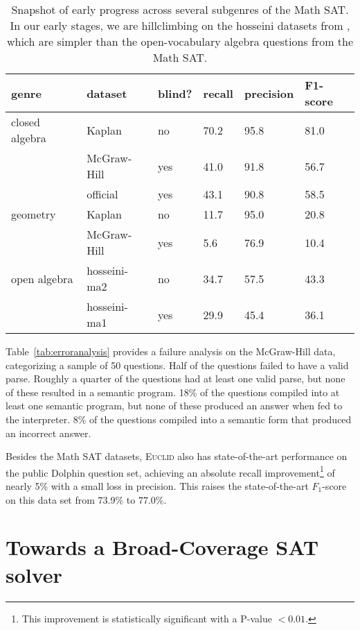 \documentclass[11pt,letterpaper]{article}
\begin{document}
\begin{table*}[tb]
\begin{center}
\begin{tabular}{|l|l|l|l|l|l|}
\hline
\textbf{genre} & \textbf{dataset} & \textbf{blind?} & \textbf{recall} & \textbf{precision} & \textbf{F1-score}\\
\hline
closed algebra & Kaplan & no & 70.2 & 95.8 & 81.0 \\
& McGraw-Hill & yes & 41.0 & 91.8 & 56.7 \\
& official & yes & 43.1 & 90.8 & 58.5 \\
\hline
geometry & Kaplan & no & 11.7 & 95.0 & 20.8  \\
& McGraw-Hill & yes & 5.6 & 76.9 & 10.4 \\
\hline
open algebra & hosseini-ma2 & no & 34.7 & 57.5 & 43.3 \\
& hosseini-ma1 & yes & 29.9 & 45.4 & 36.1 \\
\hline
\end{tabular}
\end{center}
\caption{\label{tab:fullgrid} Snapshot of early progress across several subgenres of the Math SAT. In our early stages, we are hillclimbing on the hosseini datasets from \cite{Hosseini2014LearningTS}, which are simpler than the open-vocabulary algebra questions from the Math SAT.}
\end{table*}


Table~\ref{tab:erroranalysis} provides a failure analysis on the McGraw-Hill data, categorizing a sample of 50 questions. Half of the questions failed to have a valid parse. Roughly a quarter of the questions had at least one valid parse, but none of these resulted in a semantic program. 18\% of the questions compiled into at least one semantic program, but none of these produced an answer when fed to the interpreter. 8\% of the questions compiled into a semantic form that produced an incorrect answer.

Besides the Math SAT datasets, \textsc{Euclid} also has state-of-the-art performance on the public Dolphin question set, achieving an absolute recall improvement\footnote{This improvement is statistically significant with a P-value $< 0.01$.} of nearly 5\% with a small loss in precision. This raises the state-of-the-art $F_1$-score on this data set from 73.9\% to 77.0\%.



\section{Towards a Broad-Coverage SAT solver}
\end{document}
